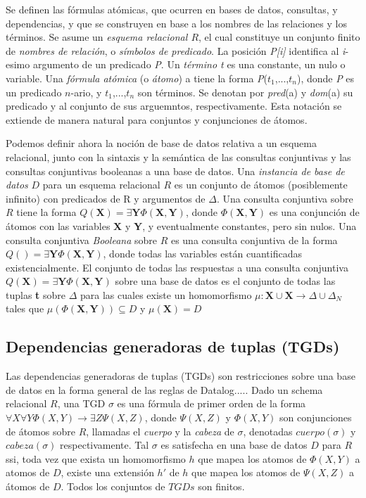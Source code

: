 \documentclass[11pt,a4paper,twoside]{tesis}
\theoremstyle{definition}
\begin{document}
Se definen las fórmulas atómicas, que ocurren en bases de datos, consultas, y dependencias, y que se construyen en base a los nombres de las relaciones y los términos. Se asume un \textit{esquema relacional $R$}, el cual constituye un conjunto finito de \textit{nombres de relación}, o \textit{símbolos de predicado}. La posición \textit{P[i]} identifica al \textit{i}-esimo argumento de un predicado \textit{P}. Un \textit{término t} es una constante, un nulo o variable. Una \textit{fórmula atómica} (o \textit{átomo}) a tiene la forma \textit{P}($t_{1}$,...,$t_{n}$), donde \textit{P} es un predicado $n$-ario, y $t_{1}$,...,$t_{n}$ son términos. Se denotan por \textit{pred}(a) y \textit{dom}(a) su predicado y al conjunto de sus arguemntos, respectivamente. Esta notación se extiende de manera natural para conjuntos y conjunciones de átomos. 

Podemos definir ahora la noción de base de datos relativa a un esquema relacional, junto con la sintaxis y la semántica de las consultas conjuntivas y las consultas conjuntivas booleanas a una base de datos. Una \textit{instancia de base de datos} $D$ para un esquema relacional $R$ es un conjunto de átomos (posiblemente infinito) con predicados de R y argumentos de $\Delta$. Una consulta conjuntiva sobre $R$ tiene la forma $Q(\textbf{X}) = \exists\textbf{Y}\Phi(\textbf{X},\textbf{Y})$, donde $\Phi(\textbf{X},\textbf{Y})$ es una conjunción de átomos con las variables \textbf{X} y \textbf{Y}, y eventualmente constantes, pero sin nulos. Una consulta conjuntiva \textit{Booleana} sobre $R$ es una consulta conjuntiva de la forma $Q() = \exists\textbf{Y}\Phi(\textbf{X},\textbf{Y})$, donde todas las variables están cuantificadas existencialmente. El conjunto de todas las respuestas a una consulta conjuntiva $Q(\textbf{X}) = \exists\textbf{Y}\Phi(\textbf{X},\textbf{Y})$ sobre una base de datos es el conjunto de todas las tuplas \textbf{t} sobre $\Delta$ para las cuales existe un homomorfismo $\mu: \textbf{X} \cup \textbf{X} \rightarrow \Delta \cup \Delta_{N}$ tales que $\mu(\Phi(\textbf{X},\textbf{Y})) \subseteq D$ y $\mu(\textbf{X}) = D$

\subsection{Dependencias generadoras de tuplas (TGDs)}
Las dependencias generadoras de tuplas (TGDs) son restricciones sobre una base de datos en la forma general de las reglas de Datalog.....
Dado un schema relacional $R$, una TGD $\sigma$ es una fórmula de primer orden de la forma $\forall X \forall Y \Phi (X, Y) \rightarrow \exists Z \Psi (X, Z)$, donde $ \Psi (X, Z)$ y $\Phi (X, Y)$ son conjunciones de átomos sobre $R$, llamadas el \textit{cuerpo} y la \textit{cabeza} de $\sigma$, denotadas $cuerpo(\sigma)$ y $cabeza(\sigma)$ respectivamente. Tal $\sigma$ es satisfecha en una base de datos $D$ para $R$ ssi, toda vez que exista un homomorfismo $h$ que mapea los atomos de $\Phi(X, Y)$ a atomos de $D$, existe una extensión $h\prime$ de $h$ que mapea los atomos de $\Psi (X, Z)$ a átomos de $D$. Todos los conjuntos de $TGDs$ son finitos.
\end{document}
